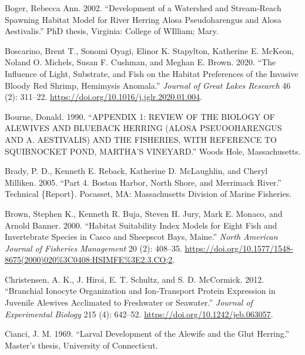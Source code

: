 \documentclass[
]{book}
\newlength{\cslhangindent}
\newlength{\cslentryspacingunit} %
\newenvironment{CSLReferences}[2] %
 {%
  \setlength{\parindent}{0pt}
  \ifodd #1
  \let\oldpar\par
  \def\par{\hangindent=\cslhangindent\oldpar}
  \fi
  \setlength{\parskip}{#2\cslentryspacingunit}
 }%
 {}
\begin{document}
\begin{CSLReferences}{1}{0}
\leavevmode{}%
Boger, Rebecca Ann. 2002. {``Development of a Watershed and Stream-Reach Spawning Habitat Model for River Herring {Alosa} Pseudoharengus and {Alosa} Aestivalis.''} PhD thesis, Virginia: College of WIlliam; Mary.

\leavevmode{}%
Boscarino, Brent T., Sonomi Oyagi, Elinor K. Stapylton, Katherine E. McKeon, Noland O. Michels, Susan F. Cushman, and Meghan E. Brown. 2020. {``The Influence of Light, Substrate, and Fish on the Habitat Preferences of the Invasive Bloody Red Shrimp, {Hemimysis} Anomala.''} \emph{Journal of Great Lakes Research} 46 (2): 311--22. \url{https://doi.org/10.1016/j.jglr.2020.01.004}.

\leavevmode{}%
Bourne, Donald. 1990. {``{APPENDIX} 1: {REVIEW} {OF} {THE} {BIOLOGY} {OF} {ALEWIVES} {AND} {BLUEBACK} {HERRING} ({ALOSA} {PSEUOOHARENGUS} {AND} {A}. {AESTIVALIS}) {AND} {THE} {FISHERIES}, {WITH} {REFERENCE} {TO} {SQUIBNOCKET} {POND}, {MARTHA}'{S} {VINEYARD}.''} Woods Hole, Massachusetts.

\leavevmode{}%
Brady, P. D., Kenneth E. Reback, Katherine D. McLaughlin, and Cheryl Milliken. 2005. {``Part 4. {Boston} {Harbor}, {North} {Shore}, and {Merrimack} {River}.''} Technical \{Report\}. Pocasset, MA: Massachusetts Division of Marine Fisheries.

\leavevmode{}%
Brown, Stephen K., Kenneth R. Buja, Steven H. Jury, Mark E. Monaco, and Arnold Banner. 2000. {``Habitat {Suitability} {Index} {Models} for {Eight} {Fish} and {Invertebrate} {Species} in {Casco} and {Sheepscot} {Bays}, {Maine}.''} \emph{North American Journal of Fisheries Management} 20 (2): 408--35. \url{https://doi.org/10.1577/1548-8675(2000)020\%3C0408:HSIMFE\%3E2.3.CO;2}.

\leavevmode{}%
Christensen, A. K., J. Hiroi, E. T. Schultz, and S. D. McCormick. 2012. {``Branchial Ionocyte Organization and Ion-Transport Protein Expression in Juvenile Alewives Acclimated to Freshwater or Seawater.''} \emph{Journal of Experimental Biology} 215 (4): 642--52. \url{https://doi.org/10.1242/jeb.063057}.

\leavevmode{}%
Cianci, J. M. 1969. {``Larval {Development} of the Alewife and the Glut Herring.''} Master's thesis, University of Connecticut.


\end{CSLReferences}
\end{document}

